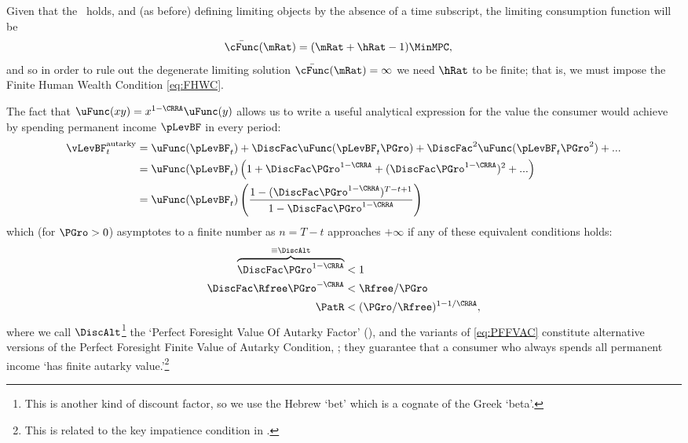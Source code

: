 \documentclass[BufferStockTheory]{subfiles}
\begin{document}
Given that the {\RIC}~holds, and (as before) defining limiting objects by the absence of a time subscript, the limiting consumption function will be
\begin{align}\label{eq:cFuncPFUnc}
  \bar{\cFunc}(\mRat)  & = (\mRat+\hRat-1)\MinMPC, 
\end{align}
and so in order to rule out the degenerate limiting
solution $\bar{\cFunc}(\mRat) = \infty$ we need $\hRat$ to be finite; that is, we
must impose the Finite Human Wealth Condition \eqref{eq:FHWC}.

\hypertarget{ValuePFAnalytical}{}
\hypertarget{Autarky-Value-PF}{}

The fact that $\uFunc(xy) = x^{1-\CRRA}\uFunc(y)$ allows us to write a useful analytical expression for the value the consumer would achieve by spending permanent income $\pLevBF$ in every period:
\begin{align}
  \vLevBF_{t}^{\text{autarky}}  & = \uFunc(\pLevBF_{t})+\DiscFac \uFunc(\pLevBF_{t}\PGro)+\DiscFac^{2} \uFunc(\pLevBF_{t} \PGro^{2})+... \label{eq:ValuePFAnalyticalAutarky}
  \\  & = \uFunc(\pLevBF_{t})\left(1+\DiscFac \PGro^{1-\CRRA}+(\DiscFac \PGro^{1-\CRRA})^{2}+...\right) \notag 
  \\  & = \uFunc(\pLevBF_{t})\left(\frac{1-(\DiscFac \PGro^{1-\CRRA})^{T-t+1}}{1-\DiscFac \PGro^{1-\CRRA}}\right) \notag
\end{align}
which (for $\PGro>0$) asymptotes to a finite number as $n=T-t$ approaches $+\infty$ if any of these equivalent conditions holds:
\begin{align}
  \overbrace{\DiscFac \PGro^{1-\CRRA} }^{\equiv \DiscAlt}  & < 1  \nonumber 
  \\ \DiscFac \Rfree \PGro^{-\CRRA}  & < \Rfree/\PGro \label{eq:PFFVAC} 
  \\ \PatR    & < (\PGro/\Rfree)^{1-1/\CRRA},  \nonumber
\end{align}
where we call $\DiscAlt$\footnote{This is another kind of discount factor, so we use the Hebrew `bet' which is a cognate of the Greek `beta'.} the `Perfect Foresight Value Of Autarky Factor' ({\PFVAF}), and the variants of \eqref{eq:PFFVAC} constitute alternative versions of the Perfect Foresight Finite Value of Autarky Condition, \PFFVAC; they guarantee that a consumer who always spends all permanent income `has finite autarky value.'\footnote{This is related to the key impatience condition in \cite{asHomogeneous}.}
\end{document}
